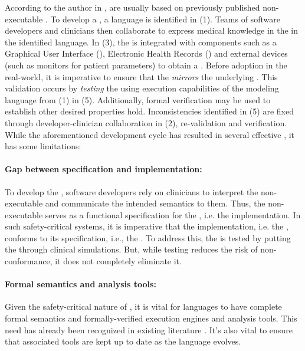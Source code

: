 According to the author in \cite{PelegJBI13}, \CIGs{} are usually based on previously published non-executable
\BPGs{}. To develop a \CIG{}, a language is identified in (1). Teams of
software developers and clinicians then collaborate to express medical knowledge
in the \BPG{} in the identified language. In (3), the \CIG{}
is integrated with components such as a Graphical User
Interface (\GUI{}), Electronic Health Records (\EHRs{}) and external devices
(such as monitors for patient parameters) to obtain a \CDSS. Before adoption
in the real-world, it is imperative to ensure that the \CIG{} \emph{mirrors}
the underlying \BPG{}. This validation occurs by \emph{testing} the \CDSS{}
using execution capabilities of the modeling language from (1) in (5).
Additionally, formal verification may be used to establish other desired
properties hold. Inconsistencies identified in (5) are fixed through developer-clinician
collaboration in (2),  re-validation and
verification. While the aforementioned development cycle has resulted in several
effective \CDSSs{}, it has some limitations:

\paragraph{Gap between specification and implementation:}

To develop the \CIG{}, software developers rely on clinicians to interpret the
non-executable \BPG{} and communicate
the intended semantics to them. Thus, the non-executable \BPG{} serves as a functional specification for
the \CIG{}, i.e. the implementation. In such safety-critical systems, it is
imperative that the implementation, i.e. the \CIG{}, conforms to its
specification, i.e., the \BPG{}. To address this, the \CIG{} is tested by
putting the \CDSS{} through clinical simulations. But, while testing reduces
the risk of non-conformance, it does not completely eliminate it.

\paragraph{Formal semantics and analysis tools:}

Given the safety-critical nature of \CDSSs{}, it is vital for \CIG{} languages
to have complete formal semantics and formally-verified execution engines and
analysis tools. This need has already been recognized in existing literature
\cite{SuttonAMIA03, ShaharAMIA96}. It's also vital to ensure that
associated tools are kept up to date as the language evolves.

